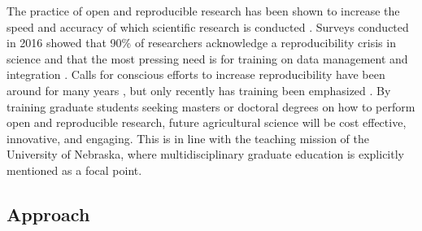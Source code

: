 \documentclass[12pt,letterpaper]{article}
\begin{document}
The practice of open and reproducible research has been shown to increase the speed and accuracy of which scientific research is conducted \citep{stewart-lowndes2017path, wilson2016good}.
Surveys conducted in 2016 showed that 90\% of researchers acknowledge a reproducibility crisis in science \citep{baker2016scientists} and that the most pressing need is for training on data management and integration \citep{barone2017unmet}. 
Calls for conscious efforts to increase reproducibility have been around for many years \citep{buckheit1995wavelab, peng2011reproducible}, but only recently has training been emphasized \citep{schmidt2016stepping, stewart-lowndes2017path, wilson2016good}. 
By training graduate students seeking masters or doctoral degrees on how to perform open and reproducible research, future agricultural science will be cost effective, innovative, and engaging. 
This is in line with the teaching mission of the University of Nebraska, where multidisciplinary graduate education is explicitly mentioned as a focal point. 



\subsection{Approach}



 
 
 
\end{document}
